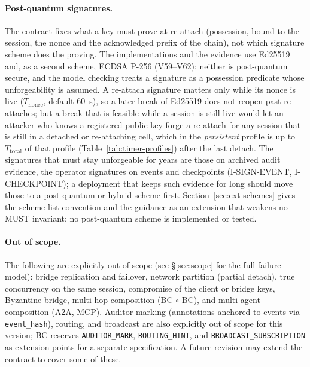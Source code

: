 \paragraph{Post-quantum signatures.} The contract fixes what a key must
prove at re-attach (possession, bound to the session, the nonce and the
acknowledged prefix of the chain), not which signature scheme does the
proving. The implementations and the evidence use Ed25519 and, as a second
scheme, ECDSA P-256 (V59--V62); neither is post-quantum secure, and the model checking treats a signature as a
possession predicate whose unforgeability is assumed. A re-attach signature matters only while its nonce is live
($T_{\text{nonce}}$, default 60~s), so a later break of Ed25519 does
not reopen past re-attaches; but a break that is feasible while a
session is still live would let an attacker who knows a registered
public key forge a re-attach for any session that is still in a
detached or re-attaching cell, which in the \emph{persistent} profile
is up to $T_{\text{total}}$ of that profile (Table~\ref{tab:timer-profiles}) after the last detach. The signatures
that must stay unforgeable for years are those on archived audit evidence,
the operator signatures on events and checkpoints (I-SIGN-EVENT,
I-CHECKPOINT); a deployment that keeps such evidence for long should move
those to a post-quantum or hybrid scheme first. Section~\ref{sec:ext-schemes}
gives the scheme-list convention and the guidance as an extension that
weakens no MUST invariant; no post-quantum scheme is implemented or tested.

\paragraph{Out of scope.} The following are explicitly out of scope
(see \S\ref{sec:scope} for the full failure model): bridge
replication and failover, network partition (partial detach), true
concurrency on the same session, compromise of the client or bridge
keys, Byzantine bridge, multi-hop composition (BC $\circ$ BC), and
multi-agent composition (A2A, MCP). Auditor
marking (annotations anchored to events via \texttt{event\_hash}),
routing, and broadcast are also explicitly out of scope for this
version; BC reserves \texttt{AUDITOR\_MARK}, \texttt{ROUTING\_HINT},
and \texttt{BROADCAST\_SUBSCRIPTION} as extension points for a
separate specification. A
future revision may extend the contract to cover some of these.

